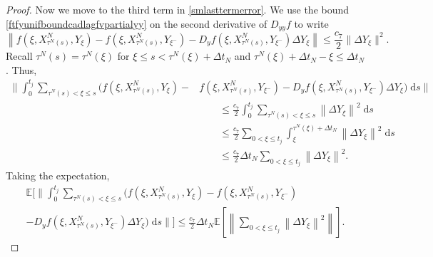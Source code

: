 \documentclass[reqno,12pt]{amsart}
\theoremstyle{plain} %
\theoremstyle{definition} %
\begin{document}
\begin{proof}
    Now we move to the third term in \cref{smlasttermerror}. We use the bound \cref{ftfyunifboundcadlagfvpartialyy} on the second derivative of $D_{yy}f$ to write
    \begin{equation*}
        \left\| f(\xi, X_{\tau^N(s)}^N, Y_\xi) - f(\xi, X_{\tau^N(s)}^N, Y_{\xi^{-}}) - D_y f(\xi, X_{\tau^N(s)}^N, Y_{\xi^-}) \Delta Y_\xi \right\| \leq \frac{c_7}{2}\|\Delta Y_\xi\|^2.
    \end{equation*}
    Recall $\tau^N(s) = \tau^N(\xi)$ for $\xi \leq s < \tau^N(\xi) + \Delta t_N$ and $\tau^N(\xi) + \Delta t_N- \xi \leq \Delta t_N$. Thus,
    \begin{align*}
        \Bigg\|\int_0^{t_j} \sum_{\tau^N(s) < \xi \leq s} \bigg(f(\xi, X_{\tau^N(s)}^N, Y_\xi) - & f(\xi, X_{\tau^N(s)}^N, Y_{\xi^{-}}) - D_y f(\xi, X_{\tau^N(s)}^N, Y_{\xi^-})\Delta Y_\xi\bigg) \;\mathrm{d}s\Bigg\| \\
        & \qquad \leq \frac{c_7}{2}\int_0^{t_j} \sum_{\tau^N(s) < \xi \leq s} \left\| \Delta Y_\xi \right\|^2\;\mathrm{d}s \\
        & \qquad \leq \frac{c_7}{2}\sum_{0 < \xi \leq t_j}\int_\xi^{\tau^N(\xi) + \Delta t_N} \left\| \Delta Y_\xi \right\|^2\;\mathrm{d}s \\
        & \qquad \leq \frac{c_7}{2} \Delta t_N  \sum_{0 < \xi \leq t_j}\left\|\Delta Y_\xi \right\|^2.
    \end{align*}
    Taking the expectation,
    \begin{multline}
        \label{strongorderterm3}
        \mathbb{E}\Bigg[\Bigg\|\int_0^{t_j} \sum_{\tau^N(s) < \xi \leq s} \bigg(f(\xi, X_{\tau^N(s)}^N, Y_\xi) - f(\xi, X_{\tau^N(s)}^N, Y_{\xi^{-}}) \\
        - D_y f(\xi, X_{\tau^N(s)}^N, Y_{\xi^-})\Delta Y_\xi\bigg) \;\mathrm{d}s\Bigg\|\Bigg]
        \leq \frac{c_7}{2} \Delta t_N \mathbb{E}\left[\left\|\sum_{0 < \xi \leq t_j}\left\| \Delta Y_\xi \right\|^2\right\|\right].
    \end{multline}


\end{proof}
\end{document}
